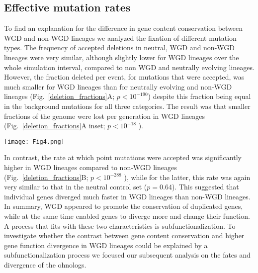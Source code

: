 \subsection{Effective mutation rates}
To find an explanation for the difference in gene content conservation between WGD and non-WGD lineages we analyzed the fixation of different mutation types. The frequency of accepted deletions in neutral,  WGD and non-WGD lineages were very similar, although slightly lower for WGD lineages over the whole simulation interval, compared to non WGD and neutrally evolving lineages. However, the fraction deleted per event, for mutations that were accepted, was much smaller for WGD lineages than for neutrally evolving and non-WGD lineages (Fig.~\ref{deletion_fractions}A; $p<10^{-190}$) despite this fraction being equal in the background mutations for all three categories. The result was that smaller fractions of the genome were lost per generation in WGD lineages (Fig.~\ref{deletion_fractions}A inset; $p<10^{-18}$ ). 

\begin{figure*}
\begin{center}
\texttt{[image: Fig4.png]}
\end{center}
\caption{\textbf{Deletion and point mutation rates in the line of descent.} (A) Rate of genes deleted per accepted deletion event as a fraction of total genome size. These fractions were averaged for all fit runs with (red) and without (cyan) a WGD as well as a control set of runs that continued without environmental change (gray), and binned in 1000 generation intervals. In the inset, accepted deletion fractions are per generation instead of per event. (B) Accepted point mutation rates per generation as a fraction of total genome size. The fractions were averaged for all fit runs with (red) and without (cyan) a WGD as well as a control set of runs that continued without environmental change (gray), and binned in 1000 generation intervals.}
\label{deletion_fractions}
\end{figure*}

In contrast, the rate at which point mutations were accepted was significantly higher in WGD lineages compared to non-WGD lineages (Fig.~\ref{deletion_fractions}B; $p<10^{-288}$ ), while for the latter, this rate was again very similar to that in the neutral control set ($p=0.64$). This suggested that individual genes diverged much faster in WGD lineages than non-WGD lineages. In summary, WGD appeared to promote the conservation of duplicated genes, while at the same time enabled genes to diverge more and change their function. A process that fits with these two characteristics is subfunctionalization. To investigate whether the contrast between gene content conservation and higher gene function divergence in WGD lineages could be explained by a subfunctionalization process we focused our subsequent analysis on the fates and divergence of the ohnologs. 

